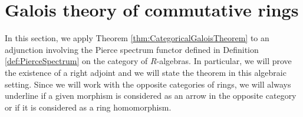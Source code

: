 \section{Galois theory of commutative rings}
\label{sec:comm_rings}

In this section, we apply Theorem \ref{thm:CategoricalGaloisTheorem} to an adjunction involving the Pierce spectrum functor defined in Definition \ref{def:PierceSpectrum} on the category of $R$-algebras. In particular, we will prove the existence of a right adjoint and we will state the theorem in this algebraic setting. Since we will work with the opposite categories of rings, we will always underline if a given morphism is considered as an arrow in the opposite category or if it is considered as a ring homomorphism.

